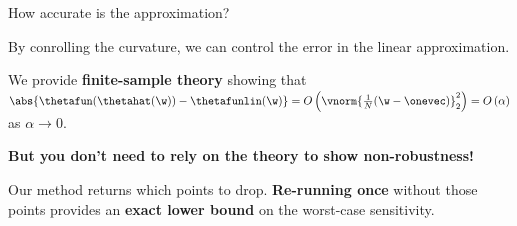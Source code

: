 \begin{frame}{How accurate is the approximation?}

\begin{minipage}{0.45\textwidth}
    By conrolling the curvature,
    we can control the error in the linear approximation.
\end{minipage}
%
\begin{minipage}{0.45\textwidth}
\end{minipage}

\vspace{1em}
We provide \textbf{finite-sample theory}
\parencite{giordano2019swiss}
showing that
$\abs{\thetafun(\thetahat(\w)) - \thetafunlin(\w)} =
O\left(\vnorm{\frac{1}{N}(\w - \onevec)}^2_2\right) =
O\left(\alpha\right)$ as $\alpha \rightarrow 0$.

\vspace{1em}

\hrulefill

\pause
\vspace{1em}
\textbf{But you don't need to rely on the theory to show non-robustness!}

\vspace{1em}
Our method returns which points to drop.  \textbf{Re-running once}
without those points provides an \textbf{exact lower bound} on the worst-case
sensitivity.

%
\end{frame}




